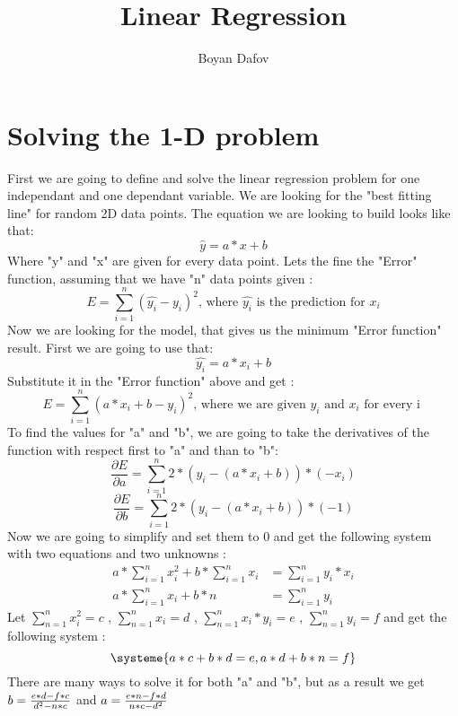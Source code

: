\documentclass{article}
\begin{document}
\title{Linear Regression}
\author{Boyan Dafov}
\maketitle
\newpage
\section{Solving the 1-D problem}
	First we are going to define and solve the linear regression problem for one independant and one dependant variable. We are looking for the "best fitting line" for random 2D data points. The equation we are looking to build looks like that:
\begin{equation*}
\hat{y} = a * x + b
\end{equation*}
	Where "y" and "x" are given for every data point. Lets the fine the "Error" function, assuming that we have "n" data points given :
\begin{equation*}
E = \sum_{i=1}^{n} (\hat{y_i} - y_i) ^ 2
\text{, where } 
\hat{y_i} 
\text{ is the prediction for }
x_i
\end{equation*}
Now we are looking for the model, that gives us the minimum "Error function" result. First we are going to use that:
\begin{equation*}
\hat{y_i} = a * x_i + b
\end{equation*}
Substitute it in the "Error function" above and get :
\begin{equation*}
E = \sum_{i=1}^{n} (a * x_i + b - y_i) ^ 2
\text{, where we are given } 
y_i 
\text{ and }
x_i
\text{ for every i }
\end{equation*}
To find the values for "a" and "b", we are going to take the derivatives of the function with respect first to "a" and than to "b":
\begin{equation*}
\frac{\partial E}{\partial a} = \sum_{i=1}^{n} 2 * (y_i - (a * x_i + b)) * (-x_i)
\end{equation*}
\begin{equation*}
\frac{\partial E}{\partial b} = \sum_{i=1}^{n} 2 * (y_i - (a * x_i + b)) * (-1)
\end{equation*}
Now we are going to simplify and set them to 0 and get the following system with two equations and two unknowns :
\begin{align*}
  a * \sum_{i=1}^{n} x_i^2 + b * \sum_{i=1}^{n} x_i &= \sum_{i=1}^{n} y_i * x_i \\
  a * \sum_{i=1}^{n} x_i + b * n &= \sum_{i=1}^{n} y_i
\end{align*}
Let $\sum_{n=1}^{n} x_i^2 = c$ , $\sum_{n=1}^{n} x_i = d$ , $\sum_{n=1}^{n} x_i * y_i = e$ , $\sum_{n=1}^{n} y_i = f$ and get the following system : 
\begin{equation*}
  \systeme{
  a * c + b * d = e,
  a * d + b * n = f
  }
\end{equation*}
There are many ways to solve it for both "a" and "b", but as a result we get 
$b = \frac{e * d - f * c \hfill}{d^2 - n * c}$ and $a = \frac{e * n - f * d \hfill}{n * c - d^2}$ 
\end{document}
